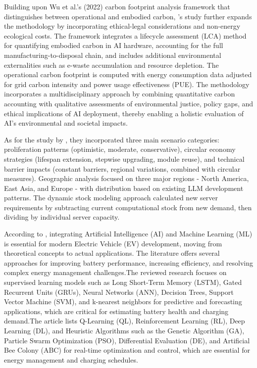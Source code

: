 \documentclass[a4paper, 12pt]{article}
\begin{document}
Building upon Wu et al.'s (2022) carbon footprint analysis framework that distinguishes between operational and embodied carbon, \citet{Zhuk2023}'s study further expands the methodology by incorporating ethical-legal considerations and non-energy ecological costs. The framework integrates a lifecycle assessment (LCA) method for quantifying embodied carbon in AI hardware, accounting for the full manufacturing-to-disposal chain, and includes additional environmental externalities such as e-waste accumulation and resource depletion. The operational carbon footprint is computed with energy consumption data adjusted for grid carbon intensity and power usage effectiveness (PUE). The methodology incorporates a multidisciplinary approach by combining quantitative carbon accounting with qualitative assessments of environmental justice, policy gaps, and ethical implications of AI deployment, thereby enabling a holistic evaluation of AI's environmental and societal impacts.\hfill \break

As for the study by \citet{wang_2024_ewaste}, they incorporated three main scenario categories: proliferation patterns (optimistic, moderate, conservative), circular economy strategies (lifespan extension, stepwise upgrading, module reuse), and technical barrier impacts (constant barriers, regional variations, combined with circular measures). Geographic analysis focused on three major regions - North America, East Asia, and Europe - with distribution based on existing LLM development patterns. The dynamic stock modeling approach calculated new server requirements by subtracting current computational stock from new demand, then dividing by individual server capacity.\hfill \break

According to \citet{M.rauf2024}, integrating Artificial Intelligence (AI) and Machine Learning (ML) is essential for modern Electric Vehicle (EV) development, moving from theoretical concepts to actual applications.   The literature offers several approaches for improving battery performance, increasing efficiency, and resolving complex energy management challenges.The reviewed research focuses on supervised learning models such as Long Short-Term Memory (LSTM), Gated Recurrent Units (GRUs), Neural Networks (ANN), Decision Trees, Support Vector Machine (SVM), and k-nearest neighbors for predictive and forecasting applications, which are critical for estimating battery health and charging demand.The article lists Q-Learning (QL), Reinforcement Learning (RL), Deep Learning (DL), and Heuristic Algorithms such as the Genetic Algorithm (GA), Particle Swarm Optimization (PSO), Differential Evaluation (DE), and Artificial Bee Colony (ABC) for real-time optimization and control, which are essential for energy management and charging schedules.\hfill \break
\end{document}
